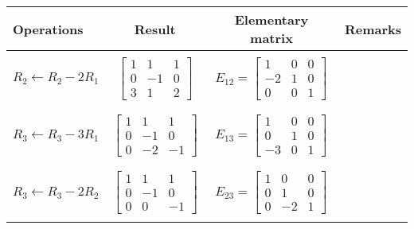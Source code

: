 \begin{frame}
{    \begin{tabular}{l|c|c|l}
      Operations & Result & Elementary matrix & Remarks \\
      \hline
      & & & \\
      $R_2\leftarrow R_2 - 2R_1$
      &
      $
      \begin{bmatrix}
        1 & 1 & 1 \\
        0 & -1 & 0 \\
        3 & 1 & 2
      \end{bmatrix}
      $
      &
      $
      E_{12}=
      \begin{bmatrix}
        1 & 0 & 0 \\
        -2 & 1 & 0 \\
        0 & 0 & 1
      \end{bmatrix}
      $
      &
      \\
      & & & \\
      \hline
      & & & \\
      $R_3\leftarrow R_3-3R_1$
      &
      $
      \begin{bmatrix}
        1 & 1 & 1 \\
        0 & -1 & 0 \\
        0 & -2 & -1
      \end{bmatrix}
      $
      &
      $
      E_{13}=
      \begin{bmatrix}
        1 & 0 & 0 \\
        0 & 1 & 0 \\
        -3 & 0 & 1
      \end{bmatrix}
      $
      &
      \\
      & & & \\
      \hline
      & & & \\
      $R_3\leftarrow R_3 - 2R_2$
      &
      $
      \begin{bmatrix}
        1 & 1 & 1 \\
        0 & -1 & 0 \\
        0 & 0 & -1
      \end{bmatrix}
      $
      &
      $
      E_{23}=
      \begin{bmatrix}
        1 & 0 & 0 \\
        0 & 1 & 0 \\
        0 & -2 & 1
      \end{bmatrix}
      $
      &
      \\
      & & & \\
    \end{tabular}
  }
  
\end{frame}

